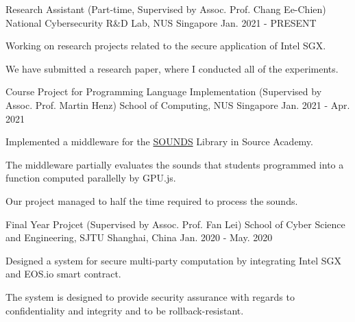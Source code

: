 

\begin{cventries}


    \cventry
    {Research Assistant (Part-time, Supervised by Assoc. Prof. Chang Ee-Chien)} %
    {National Cybersecurity R\&D Lab, NUS} %
    {Singapore} %
    {Jan. 2021 - PRESENT} %
    { %
        \begin{cvitems}
            \item Working on research projects related to the secure application of Intel SGX.
            \item We have submitted a research paper, where I conducted all of the experiments.
        \end{cvitems}
    }


    \cventry
    {Course Project for Programming Language Implementation (Supervised by Assoc. Prof. Martin Henz)} %
    {School of Computing, NUS} %
    {Singapore} %
    {Jan. 2021 - Apr. 2021} %
    { %
        \begin{cvitems}
            \item Implemented a middleware for the \href{https://source-academy.github.io/source/SOUNDS/index.html}{SOUNDS} Library in Source Academy.
            \item The middleware partially evaluates the sounds that students programmed into a function computed parallelly by GPU.js.
            \item Our project managed to half the time required to process the sounds.
        \end{cvitems}
    }


    \cventry
    {Final Year Projcet (Supervised by Assoc. Prof. Fan Lei)} %
    {School of Cyber Science and Engineering, SJTU} %
    {Shanghai, China} %
    {Jan. 2020 - May. 2020} %
    { %
        \begin{cvitems}
            \item Designed a system for secure multi-party computation by integrating Intel SGX and EOS.io smart contract.
            \item The system is designed to provide security assurance with regards to confidentiality and integrity and to be rollback-resistant.
        \end{cvitems}
    }


\end{cventries}
